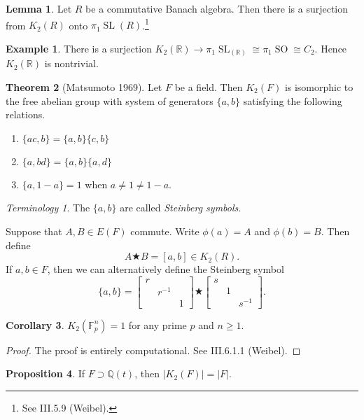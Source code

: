 \documentclass[10pt,letterpaper,cm]{nupset}
\theoremstyle{definition}
\newtheorem{exmp}[definition]{Example}
\theoremstyle{theorem}
\newtheorem{theorem}{Theorem}
\newtheorem{lemma}[theorem]{Lemma}
\newtheorem{prop}[theorem]{Proposition}
\newtheorem{corollary}[theorem]{Corollary}
\theoremstyle{remark}
\newtheorem*{term}{Terminology}
\newcommand{\F}{\mathbb F}
\newcommand{\Q}{\mathbb Q}
\newcommand{\R}{\mathbb R}
\newcommand{\1}{\mathbf{1}}
\newcommand{\0}{\vec 0}
\DeclareMathOperator*{\SL}{SL}
\DeclareMathOperator*{\SO}{SO}
\begin{document}
\begin{lemma}
Let $R$ be a commutative Banach algebra. Then there is a surjection from $K_2(R)$ onto $\pi_1\SL(R)$.\footnote{See III.5.9 (Weibel).} 
\end{lemma}

\begin{exmp}
There is a surjection $K_2(\R) \to \pi_1 \SL_(\R) \cong \pi_1\SO \cong C_2$. Hence $K_2(\R)$ is nontrivial.
\end{exmp}

\begin{theorem}[Matsumoto 1969]
Let $F$ be a field. Then $K_2(F)$ is isomorphic to the free abelian group with system of generators $\{a, b\}$  satisfying the following relations.
\begin{enumerate}
\item $\{ac, b\} = \{a, b\}\{c, b\}$
\item $\{a, bd\} = \{a, b\}\{a, d\}$
\item $\{a, 1-a\}=1$ when $a \ne 1 \ne 1-a$.
\end{enumerate}
\end{theorem}

\begin{term}
The $\{a,b\}$ are called \textit{Steinberg symbols}.
\end{term}

\smallskip

Suppose that $A, B \in E(F)$ commute. Write $\phi(a) =A$ and $\phi(b) = B$. Then define $$A \bigstar B =[a,b] \in K_2(R).$$ If $a,b\in F$, then we can alternatively define the Steinberg symbol $$\{a, b\} = \begin{bmatrix}
    r & & \\
    & r^{{-}1} & \\
    & & 1
  \end{bmatrix}
 \bigstar
  \begin{bmatrix}
    s & & \\
    & 1 & \\
    & & s^{{-}1}
  \end{bmatrix}
 .$$

\begin{corollary}
$K_2(\F_p^n) =1$ for any prime $p$ and $n\geq 1$.
\end{corollary}
\begin{proof}
The proof is entirely computational. See III.6.1.1 (Weibel).
\end{proof}

\begin{prop}
If $F \supset \Q(t)$, then $\lvert{K_2(F)}\rvert = \lvert{F}\rvert$.
\end{prop}
\end{document}
